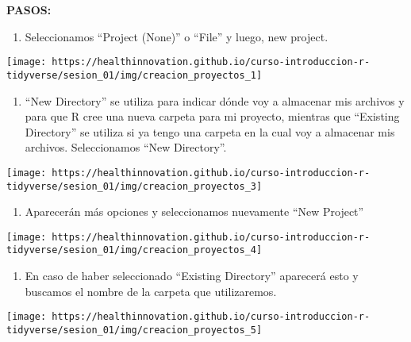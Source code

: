\documentclass[
]{book}
\providecommand{\tightlist}{%
  \setlength{\itemsep}{0pt}\setlength{\parskip}{0pt}}
\begin{document}
\textbf{PASOS:}

\begin{enumerate}
\def\labelenumi{\arabic{enumi}.}
\tightlist
\item
  Seleccionamos ``Project (None)'' o ``File'' y luego, new project.
\end{enumerate}

\begin{center}\texttt{[image: https://healthinnovation.github.io/curso-introduccion-r-tidyverse/sesion\_01/img/creacion\_proyectos\_1]} \end{center}

\begin{enumerate}
\def\labelenumi{\arabic{enumi}.}
\setcounter{enumi}{1}
\tightlist
\item
  ``New Directory'' se utiliza para indicar dónde voy a almacenar mis archivos y para que R cree una nueva carpeta para mi proyecto, mientras que ``Existing Directory'' se utiliza si ya tengo una carpeta en la cual voy a almacenar mis archivos. Seleccionamos ``New Directory''.
\end{enumerate}

\begin{center}\texttt{[image: https://healthinnovation.github.io/curso-introduccion-r-tidyverse/sesion\_01/img/creacion\_proyectos\_3]} \end{center}

\begin{enumerate}
\def\labelenumi{\arabic{enumi}.}
\setcounter{enumi}{2}
\tightlist
\item
  Aparecerán más opciones y seleccionamos nuevamente ``New Project''
\end{enumerate}

\begin{center}\texttt{[image: https://healthinnovation.github.io/curso-introduccion-r-tidyverse/sesion\_01/img/creacion\_proyectos\_4]} \end{center}

\begin{enumerate}
\def\labelenumi{\arabic{enumi}.}
\setcounter{enumi}{2}
\tightlist
\item
  En caso de haber seleccionado ``Existing Directory'' aparecerá esto y buscamos el nombre de la carpeta que utilizaremos.
\end{enumerate}

\begin{center}\texttt{[image: https://healthinnovation.github.io/curso-introduccion-r-tidyverse/sesion\_01/img/creacion\_proyectos\_5]} \end{center}
\end{document}
